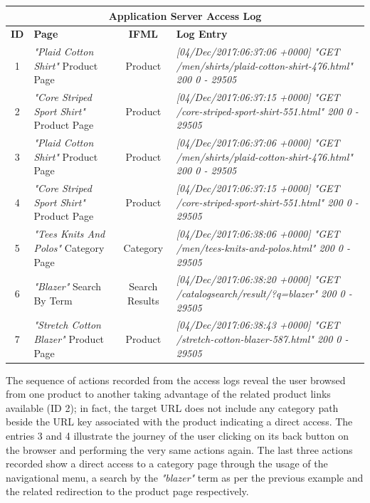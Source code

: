 \vspace{0.5cm}
\begin{center}
  \begin{tabular}{|c|p{3cm}|c|p{6cm}|}
  \hline
  \multicolumn{4}{|c|}{Application Server Access Log}\\ \hline
  \textbf{ID}&\textbf{Page}&\textbf{IFML}&\textbf{Log Entry}   \\ \hline
  1&\textit{"Plaid Cotton Shirt"} Product Page&Product&\em[04/Dec/2017:06:37:06 +0000] 
  "GET /men/shirts/plaid-cotton-shirt-476.html" 200 0 - 29505
  \\ \hline
  2&\textit{"Core Striped Sport Shirt"} Product Page &Product&\em [04/Dec/2017:06:37:15 +0000] "GET /core-striped-sport-shirt-551.html" 200 0 - 29505
  \\ \hline
  3&\textit{"Plaid Cotton Shirt"} Product Page &Product&\em[04/Dec/2017:06:37:06 +0000] "GET /men/shirts/plaid-cotton-shirt-476.html" 200 0 - 29505
  \\ \hline
  4&\textit{"Core Striped Sport Shirt"} Product Page &Product&\em[04/Dec/2017:06:37:15 +0000] "GET /core-striped-sport-shirt-551.html" 200 0 - 29505
  \\ \hline
  5&\textit{"Tees Knits And Polos"} Category Page &Category&\em[04/Dec/2017:06:38:06 +0000] "GET /men/tees-knits-and-polos.html" 200 0 - 29505
  \\ \hline
  6&\textit{"Blazer"} Search By Term&Search Results&\em[04/Dec/2017:06:38:20 +0000] "GET /catalogsearch/result/?q=blazer" 200 0 - 29505
  \\ \hline
  7&\textit{"Stretch Cotton Blazer"} Product Page &Product&\em[04/Dec/2017:06:38:43 +0000] "GET /stretch-cotton-blazer-587.html" 200 0 - 29505
  \\ \hline
  \end{tabular}
  \end{center}
\vspace{0.5cm}

The sequence of actions recorded from the access logs reveal the user browsed from one product to another taking advantage of the related product links available (ID 2); in fact, the target URL does not include any category path beside the URL key associated with the product indicating a direct access. The entries 3 and 4 illustrate the journey of the user clicking on its back button on the browser and performing the very same actions again. The last three actions recorded show a direct access to a category page through the usage of the navigational menu, a search by the \textit{"blazer"} term as per the previous example and the related redirection to the product page respectively.

